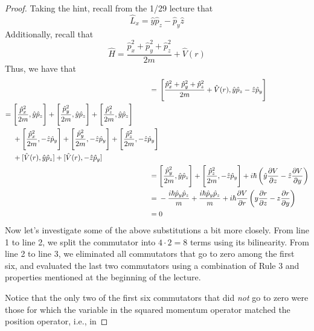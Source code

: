 \documentclass[../psets.tex]{subfiles}
\begin{document}
\begin{enumerate}
\begin{enumerate}
        \begin{proof}
            Taking the hint, recall from the 1/29 lecture that
            \begin{equation*}
                \hat{L}_x = \hat{y}\hat{p}_z-\hat{p}_y\hat{z}
            \end{equation*}
            Additionally, recall that
            \begin{equation*}
                \hat{H} = \frac{\hat{p}_x^2+\hat{p}_y^2+\hat{p}_z^2}{2m}+\hat{V}(r)
            \end{equation*}
            Thus, we have that
            \begin{align*}
                [\hat{H},\hat{L}_x] ={}& \left[ \frac{\hat{p}_x^2+\hat{p}_y^2+\hat{p}_z^2}{2m}+\hat{V}(r),\hat{y}\hat{p}_z-\hat{z}\hat{p}_y \right]\\
                \begin{split}
                    ={}& \Bigg[ \frac{\hat{p}_x^2}{2m},\hat{y}\hat{p}_z \Bigg]+\Bigg[ \frac{\hat{p}_y^2}{2m},\hat{y}\hat{p}_z \Bigg]+\Bigg[ \frac{\hat{p}_z^2}{2m},\hat{y}\hat{p}_z \Bigg]\\
                    & +\Bigg[ \frac{\hat{p}_x^2}{2m},-\hat{z}\hat{p}_y \Bigg]+\Bigg[ \frac{\hat{p}_y^2}{2m},-\hat{z}\hat{p}_y \Bigg]+\Bigg[ \frac{\hat{p}_z^2}{2m},-\hat{z}\hat{p}_y \Bigg]\\
                    & +[\hat{V}(r),\hat{y}\hat{p}_z]+[\hat{V}(r),-\hat{z}\hat{p}_y]
                \end{split}\\
                ={}& \Bigg[ \frac{\hat{p}_y^2}{2m},\hat{y}\hat{p}_z \Bigg]+\Bigg[ \frac{\hat{p}_z^2}{2m},-\hat{z}\hat{p}_y \Bigg]+i\hbar\left( \hat{y}\pdv{V}{z}-\hat{z}\pdv{V}{y} \right)\\
                ={}& -\frac{i\hbar\hat{p}_y\hat{p}_z}{m}+\frac{i\hbar\hat{p}_y\hat{p}_z}{m}+i\hbar\pdv{V}{r}\left( y\pdv{r}{z}-z\pdv{r}{y} \right)\\
                ={}& 0
            \end{align*}
            Now let's investigate some of the above substitutions a bit more closely. From line 1 to line 2, we split the commutator into $4\cdot 2=8$ terms using its bilinearity. From line 2 to line 3, we eliminated all commutators that go to zero among the first six, and evaluated the last two commutators using a combination of Rule 3 and properties mentioned at the beginning of the lecture.
            \par Notice that the only two of the first six commutators that did \emph{not} go to zero were those for which the variable in the squared momentum operator matched the position operator, i.e., in

\end{proof}
\end{enumerate}
\end{enumerate}
\end{document}
